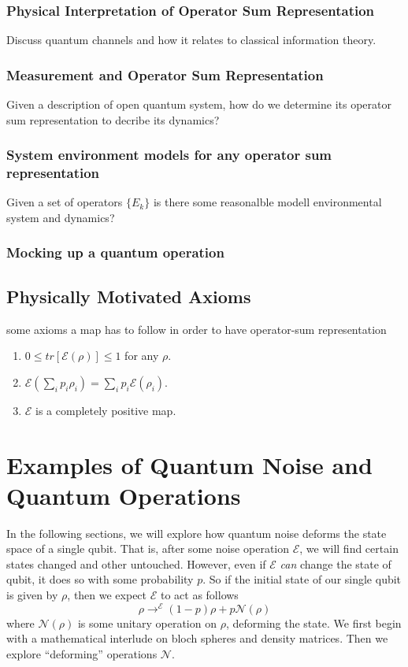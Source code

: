 \documentclass{article}
\begin{document}
\subsubsection*{Physical Interpretation of Operator Sum Representation}
Discuss quantum channels and how it relates to classical information
theory.
\subsubsection*{Measurement and Operator Sum Representation}
Given a description of open quantum system, how do we determine its
operator sum representation to decribe its dynamics?
\subsubsection*{System environment models for any operator sum representation}
Given a set of operators \(\{E_k\}\) is there some reasonalble modell
environmental system and dynamics?
\subsubsection*{Mocking up a quantum operation}

\subsection{Physically Motivated Axioms}
some axioms a map has to follow in order to have operator-sum
representation
\begin{enumerate}
  \item \(0\leq \textit{tr} [\mathcal{E}(\rho)]\leq 1\) for any \(\rho\).
  \item \(\mathcal{E}(\sum_{i}p_i\rho_i) = \sum_{i}p_i\mathcal{E}(\rho_i)\).
  \item \(\mathcal{E}\) is a completely positive map.
\end{enumerate}
\section{Examples of Quantum Noise and Quantum Operations}
In the following sections, we will explore how quantum noise deforms the state space
of a single qubit. That is, after some noise operation \(\mathcal{E}\), we will find
certain states changed and other untouched. However, even if \(\mathcal{E}\) \textit{can}
change the state of qubit, it does so with some probability \(p\). So if the
initial state of our single qubit is given by \(\rho\), then we expect \(\mathcal{E}\)
to act as follows
\[ \rho \longrightarrow^{\mathcal{E}} (1-p)\rho + p\mathcal{N}(\rho) \]
where \(\mathcal{N} (\rho)\) is some unitary operation on \(\rho\), deforming
the state. We first begin with a mathematical interlude on bloch spheres and
density matrices. Then we explore ``deforming'' operations \(\mathcal{N}\).
\end{document}
